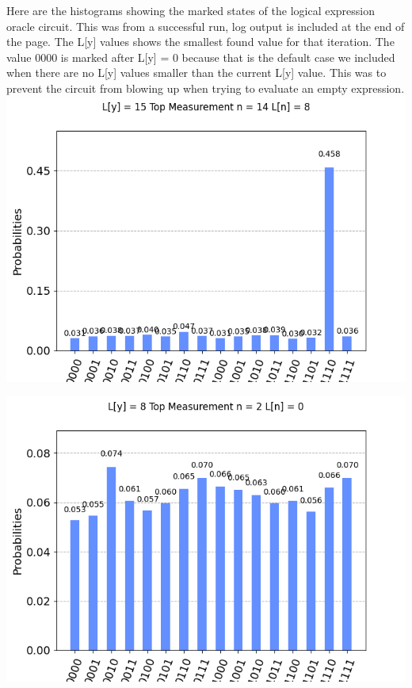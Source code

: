 \documentclass[11pt]{article}
\begin{document}
\newpage
\begin{center}
Here are the histograms showing the marked states of the logical expression oracle circuit. This was from a successful run, log output is included at the end of the page. The L[y] values shows the smallest found value for that iteration. The value 0000 is marked after L[y] = 0 because that is the default case we included when there are no L[y] values smaller than the current L[y] value. This was to prevent the circuit from blowing up when trying to evaluate an empty expression.
\includegraphics[width=\textwidth]{logical_0.png}

\includegraphics[width=\textwidth]{logical_1.png}


\end{center}
\end{document}
